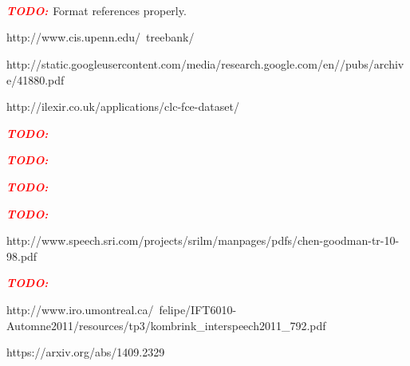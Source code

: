 \documentclass[a4paper, 12pt]{article}
\newcommand{\todo}{\textbf{\textit{\textcolor{red}{TODO: }}}}
\begin{document}
~\\~\\~\\
\noindent
\todo{Format references properly.}
\begin{thebibliography}{99}

	http://www.cis.upenn.edu/~treebank/

	http://static.googleusercontent.com/media/research.google.com/en//pubs/archive/41880.pdf

	http://ilexir.co.uk/applications/clc-fce-dataset/

	\todo{}
	
	\todo{}
	
	\todo{}
	
	\todo{}
	
	http://www.speech.sri.com/projects/srilm/manpages/pdfs/chen-goodman-tr-10-98.pdf
	
	\todo{}

	http://www.iro.umontreal.ca/~felipe/IFT6010-Automne2011/resources/tp3/kombrink\_interspeech2011\_792.pdf
	
	https://arxiv.org/abs/1409.2329

\end{thebibliography}
\end{document}
